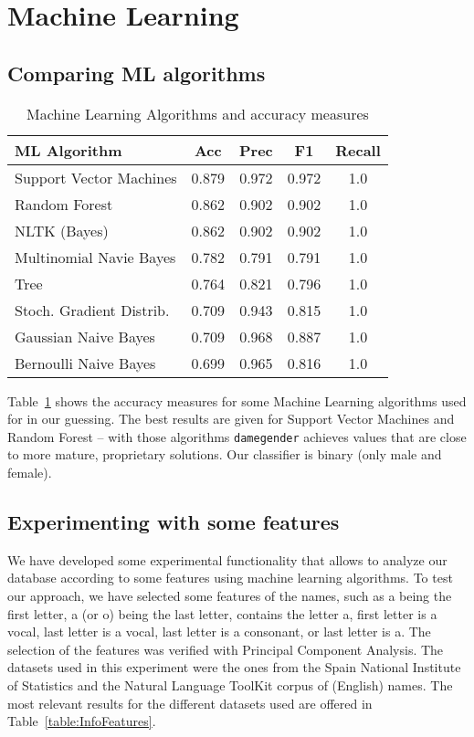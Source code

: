 \documentclass[a4paper]{article}
\begin{document}
\section{Machine Learning}

\subsection{Comparing ML algorithms}

\begin{table}
\footnotesize
\center
\begin{tabular}[]{lcccc}
  \hline
  ML Algorithm & Acc & Prec & F1 & Recall \tabularnewline
  \hline
 Support Vector Machines             &    0.879 &     0.972 &   0.972 &    1.0  \tabularnewline
 Random Forest                       &    0.862 &     0.902 &   0.902 &    1.0  \tabularnewline
 NLTK (Bayes)                        &    0.862 &     0.902 &   0.902 &    1.0  \tabularnewline
 Multinomial Navie Bayes             &    0.782 &     0.791 &   0.791 &    1.0  \tabularnewline
 Tree                                &    0.764 &     0.821 &   0.796 &    1.0  \tabularnewline
 Stoch. Gradient Distrib.    &    0.709 &     0.943 &   0.815 &    1.0  \tabularnewline
 Gaussian Naive Bayes                &    0.709 &     0.968 &   0.887 &    1.0  \tabularnewline
 Bernoulli Naive Bayes               &    0.699 &     0.965 &   0.816 &    1.0  \tabularnewline
 
\hline
\end{tabular}
\caption{Machine Learning Algorithms and accuracy measures}
\label{table:MLAccuracies}
\end{table}

Table~\ref{table:MLAccuracies} shows the accuracy measures for some Machine Learning algorithms used for in our guessing. 
The best results are given for Support Vector Machines and Random Forest -- with those algorithms \texttt{damegender} achieves values that are close to more mature, proprietary solutions.
Our classifier is binary (only male and female).

\subsection{Experimenting with some features}

We have developed some experimental functionality that allows to analyze our database according to some features using machine learning algorithms.
To test our approach, we have selected some features of the names, such as a being the first letter, a (or o) being the last letter, contains the letter a, first letter is a vocal, last letter is a vocal, last letter is a consonant, or last letter is a. 
The selection of the features was verified with Principal Component Analysis.
The datasets used in this experiment were the ones from the Spain National Institute of Statistics and the Natural Language
ToolKit corpus of (English) names.
The most relevant results for the different datasets used are offered in Table~\ref{table:InfoFeatures}.
\end{document}
